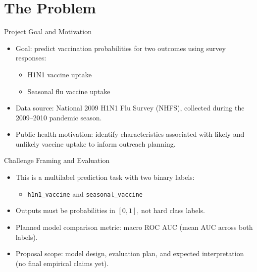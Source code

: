 \section{The Problem}

\begin{frame}{Project Goal and Motivation}
	\begin{itemize}
		\item Goal: predict vaccination probabilities for two outcomes using survey responses:
		\begin{itemize}
			\item H1N1 vaccine uptake
			\item Seasonal flu vaccine uptake
		\end{itemize}
		\item Data source: National 2009 H1N1 Flu Survey (NHFS), collected during the 2009--2010 pandemic season.
		\item Public health motivation: identify characteristics associated with likely and unlikely vaccine uptake to inform outreach planning.
	\end{itemize}
\end{frame}

\begin{frame}{Challenge Framing and Evaluation}
	\begin{itemize}
		\item This is a multilabel prediction task with two binary labels:
		\begin{itemize}
			\item \texttt{h1n1\_vaccine} and \texttt{seasonal\_vaccine}
		\end{itemize}
		\item Outputs must be probabilities in $[0,1]$, not hard class labels.
		\item Planned model comparison metric: macro ROC AUC (mean AUC across both labels).
		\item Proposal scope: model design, evaluation plan, and expected interpretation (no final empirical claims yet).
	\end{itemize}
\end{frame}